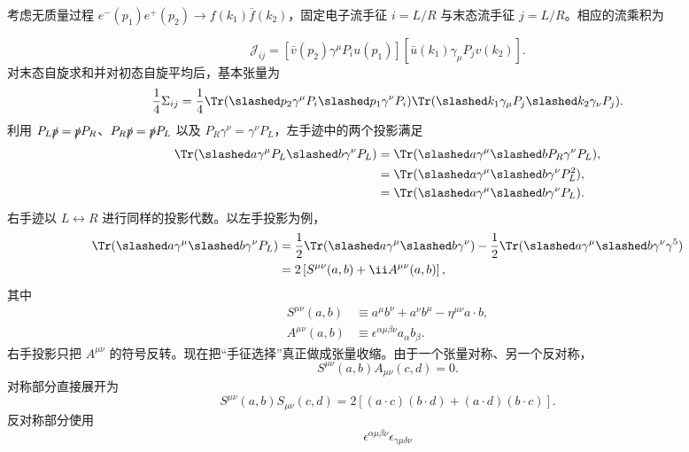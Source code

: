 \begin{derivation}[手征系数的自旋求和与角分布]
考虑无质量过程 $e^-(p_1)e^+(p_2)\to f(k_1)\bar f(k_2)$，固定电子流手征 $i=L/R$ 与末态流手征 $j=L/R$。相应的流乘积为

\begin{equation*}
\mathcal J_{ij}
=[\bar v(p_2)\gamma^\mu P_i u(p_1)]
[\bar u(k_1)\gamma_\mu P_j v(k_2)].
\end{equation*}
对末态自旋求和并对初态自旋平均后，基本张量为
\begin{equation*}
\frac14\Sigma_{ij}
=\frac14\Tr(\slashed p_2\gamma^\mu P_i\slashed p_1\gamma^\nu P_i)
\Tr(\slashed k_1\gamma_\mu P_j\slashed k_2\gamma_\nu P_j).
\end{equation*}
利用
$P_L\slashed p=\slashed pP_R$、$P_R\slashed p=\slashed pP_L$ 以及
$P_R\gamma^\nu=\gamma^\nu P_L$，左手迹中的两个投影满足
\begin{align*}
 \Tr(\slashed a\gamma^\mu P_L\slashed b\gamma^\nu P_L)
 &=\Tr(\slashed a\gamma^\mu\slashed bP_R\gamma^\nu P_L),\\
 &=\Tr(\slashed a\gamma^\mu\slashed b\gamma^\nu P_L^2),\\
 &=\Tr(\slashed a\gamma^\mu\slashed b\gamma^\nu P_L).
\end{align*}
右手迹以 $L\leftrightarrow R$ 进行同样的投影代数。以左手投影为例，
\begin{align*}
\Tr(\slashed a\gamma^\mu\slashed b\gamma^\nu P_L)
&=\frac12\Tr(\slashed a\gamma^\mu\slashed b\gamma^\nu)
-\frac12\Tr(\slashed a\gamma^\mu\slashed b\gamma^\nu\gamma^5)\\
&=2\left[S^{\mu\nu}(a,b)+\ii A^{\mu\nu}(a,b)\right],
\end{align*}
其中
\begin{align*}
S^{\mu\nu}(a,b)
&\equiv a^\mu b^\nu+a^\nu b^\mu-\eta^{\mu\nu}a\cdot b,\\
A^{\mu\nu}(a,b)
&\equiv\epsilon^{\alpha\mu\beta\nu}a_\alpha b_\beta.
\end{align*}
右手投影只把 $A^{\mu\nu}$ 的符号反转。现在把“手征选择”真正做成张量收缩。由于一个张量对称、另一个反对称，
\begin{equation*}
S^{\mu\nu}(a,b)A_{\mu\nu}(c,d)=0.
\end{equation*}
对称部分直接展开为
\begin{equation*}
S^{\mu\nu}(a,b)S_{\mu\nu}(c,d)
=2\left[(a\cdot c)(b\cdot d)+(a\cdot d)(b\cdot c)\right].
\end{equation*}
反对称部分使用
\begin{equation*}
\epsilon^{\alpha\mu\beta\nu}\epsilon_{\gamma\mu\delta\nu}

\end{equation*}
\end{derivation}
